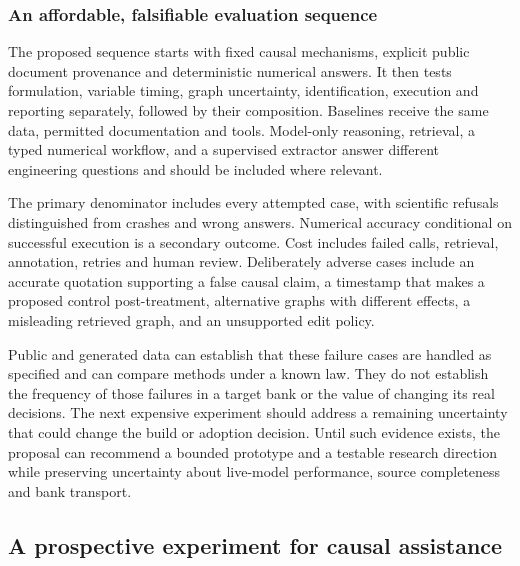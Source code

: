 \hypertarget{an-affordable-falsifiable-evaluation-sequence}{%
\subsubsection{An affordable, falsifiable evaluation
sequence}\label{an-affordable-falsifiable-evaluation-sequence}}

The proposed sequence starts with fixed causal mechanisms, explicit
public document provenance and deterministic numerical answers. It then
tests formulation, variable timing, graph uncertainty, identification,
execution and reporting separately, followed by their composition.
Baselines receive the same data, permitted documentation and tools.
Model-only reasoning, retrieval, a typed numerical workflow, and a
supervised extractor answer different engineering questions and should
be included where relevant.

The primary denominator includes every attempted case, with scientific
refusals distinguished from crashes and wrong answers. Numerical
accuracy conditional on successful execution is a secondary outcome.
Cost includes failed calls, retrieval, annotation, retries and human
review. Deliberately adverse cases include an accurate quotation
supporting a false causal claim, a timestamp that makes a proposed
control post-treatment, alternative graphs with different effects, a
misleading retrieved graph, and an unsupported edit policy.

Public and generated data can establish that these failure cases are
handled as specified and can compare methods under a known law. They do
not establish the frequency of those failures in a target bank or the
value of changing its real decisions. The next expensive experiment
should address a remaining uncertainty that could change the build or
adoption decision. Until such evidence exists, the proposal can
recommend a bounded prototype and a testable research direction while
preserving uncertainty about live-model performance, source completeness
and bank transport.

\label{exec13:census-evaluation-end}


\hypertarget{a-prospective-experiment-for-causal-assistance}{%
\subsection{A prospective experiment for causal
assistance}\label{a-prospective-experiment-for-causal-assistance}}

